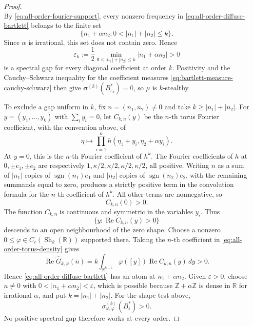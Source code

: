 \documentclass[11pt,reqno,a4paper]{amsart}
\numberwithin{equation}{section}
\theoremstyle{compact}
\theoremstyle{definition}
\theoremstyle{definition}
\newcommand{\Sh}{\operatorname{Sh}}
\begin{document}
\begin{proof}
\begin{equation}
\end{equation}
By \eqref{eq:all-order-fourier-support}, every nonzero frequency in
\eqref{eq:all-order-diffuse-bartlett} belongs to the finite set
\begin{equation}\label{eq:all-order-frequency-set}
  \{n_1+\alpha n_2:
    0<|n_1|+|n_2|\leq k\}.
\end{equation}
Since $\alpha$ is irrational, this set does not contain zero.  Hence
\begin{equation}\label{eq:all-order-gap-k}
  \varepsilon_k
  :=\frac12\min_{0<|n_1|+|n_2|\leq k}|n_1+\alpha n_2|>0
\end{equation}
is a spectral gap for every diagonal coefficient at order $k$.
Positivity and the Cauchy--Schwarz inequality for the coefficient measures
\eqref{eq:bartlett-measure-cauchy-schwarz} then give
$\boldsymbol\sigma^{(k)}(B_{\varepsilon_k}^*)=0$, so $\mu$ is
$k$-stealthy.

To exclude a gap uniform in $k$, fix $n=(n_1,n_2)\neq0$ and take
$k\geq|n_1|+|n_2|$.  For
$y=(y_1,\ldots,y_k)$ with $\sum_i y_i=0$, let $C_{k,n}(y)$ be the $n$-th
torus Fourier coefficient, with the convention above, of
\[
  \eta\longmapsto
  \prod_{i=1}^k h(\eta_1+y_i,\eta_2+\alpha y_i).
\]
At $y=0$, this is the $n$-th Fourier coefficient of $h^k$.  The Fourier
coefficients of $h$ at $0,\pm e_1,\pm e_2$ are respectively
$1,\kappa/2,\kappa/2,\kappa/2,\kappa/2$, all positive.  Writing $n$ as a sum
of $|n_1|$ copies of $\operatorname{sgn}(n_1)e_1$ and $|n_2|$ copies of
$\operatorname{sgn}(n_2)e_2$, with the remaining summands equal to zero,
produces a strictly positive term in the convolution formula for the
$n$-th coefficient of $h^k$.  All other terms are nonnegative, so
\[
  C_{k,n}(0)>0.
\]
The function $C_{k,n}$ is continuous and symmetric in the variables $y_i$.
Thus
\[
  \{y:\operatorname{Re}C_{k,n}(y)>0\}
\]
descends to an open neighbourhood of the zero shape.  Choose a nonzero
$0\leq\varphi\in C_c(\Sh_k(\mathbb R))$ supported there.  Taking the $n$-th
coefficient in \eqref{eq:all-order-torus-density} gives
\[
  \operatorname{Re}\widehat G_{k,\varphi}(n)
  =k\int_{\mathbb R^{k-1}}
     \varphi([y])\operatorname{Re}C_{k,n}(y)\,dy>0.
\]
Hence \eqref{eq:all-order-diffuse-bartlett} has an atom at
$n_1+\alpha n_2$.  Given $\varepsilon>0$, choose $n\neq0$ with
$0<|n_1+\alpha n_2|<\varepsilon$, which is possible because
$\mathbb Z+\alpha\mathbb Z$ is dense in $\mathbb R$ for irrational $\alpha$,
and put $k=|n_1|+|n_2|$.  For the shape
test above,
\[
  \sigma^{(k)}_{\varphi,\varphi}(B_\varepsilon^*)>0.
\]
No positive spectral gap therefore works at every order.
\end{proof}
\end{document}
